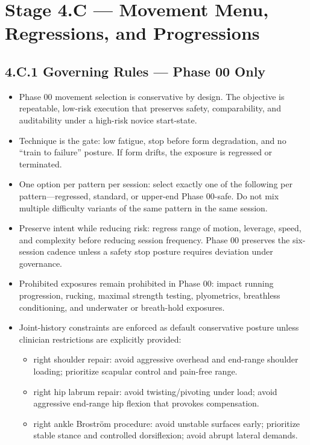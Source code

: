 \documentclass[10pt]{article}
\begin{document}
\section*{Stage 4.C — Movement Menu, Regressions, and Progressions}
{}

\subsection*{4.C.1 Governing Rules — Phase 00 Only}
{}

\begin{itemize}
\item Phase 00 movement selection is conservative by design. The objective is repeatable, low-risk execution that preserves safety, comparability, and auditability under a high-risk novice start-state.
\item Technique is the gate: low fatigue, stop before form degradation, and no “train to failure” posture. If form drifts, the exposure is regressed or terminated.
\item One option per pattern per session: select exactly one of the following per pattern—regressed, standard, or upper-end Phase 00-safe. Do not mix multiple difficulty variants of the same pattern in the same session.
\item Preserve intent while reducing risk: regress range of motion, leverage, speed, and complexity before reducing session frequency. Phase 00 preserves the six-session cadence unless a safety stop posture requires deviation under governance.
\item Prohibited exposures remain prohibited in Phase 00: impact running progression, rucking, maximal strength testing, plyometrics, breathless conditioning, and underwater or breath-hold exposures.
\item Joint-history constraints are enforced as default conservative posture unless clinician restrictions are explicitly provided:
  \begin{itemize}
  \item right shoulder repair: avoid aggressive overhead and end-range shoulder loading; prioritize scapular control and pain-free range.
  \item right hip labrum repair: avoid twisting/pivoting under load; avoid aggressive end-range hip flexion that provokes compensation.
  \item right ankle Broström procedure: avoid unstable surfaces early; prioritize stable stance and controlled dorsiflexion; avoid abrupt lateral demands.

\end{itemize}
\end{itemize}
\end{document}
